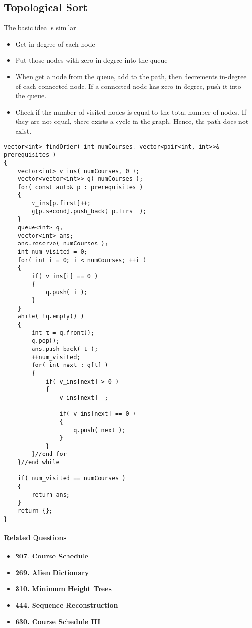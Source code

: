 \subsection{Topological Sort}
The basic idea is similar
\begin{itemize}
    \item Get in-degree of each node
    \item Put those nodes with zero in-degree into the queue
    \item When get a node from the queue, add to the path, then decrements in-degree of each connected node. If a connected node has zero in-degree, push it into the queue.
    \item Check if the number of visited nodes is equal to the total number of nodes. If they are not equal, there exists a cycle in the graph. Hence, the path does not exist.
\end{itemize}
\begin{lstlisting}[style=customc, caption={BFS}]
vector<int> findOrder( int numCourses, vector<pair<int, int>>& prerequisites )
{
    vector<int> v_ins( numCourses, 0 );
    vector<vector<int>> g( numCourses );
    for( const auto& p : prerequisites )
    {
        v_ins[p.first]++;
        g[p.second].push_back( p.first );
    }
    queue<int> q;
    vector<int> ans;
    ans.reserve( numCourses );
    int num_visited = 0;
    for( int i = 0; i < numCourses; ++i )
    {
        if( v_ins[i] == 0 )
        {
            q.push( i );
        }
    }
    while( !q.empty() )
    {
        int t = q.front();
        q.pop();
        ans.push_back( t );
        ++num_visited;
        for( int next : g[t] )
        {
            if( v_ins[next] > 0 )
            {
                v_ins[next]--;

                if( v_ins[next] == 0 )
                {
                    q.push( next );
                }
            }
        }//end for
    }//end while

    if( num_visited == numCourses )
    {
        return ans;
    }
    return {};
}
\end{lstlisting}

\paragraph{Related Questions}
\begin{itemize}
\item \textbf{207. Course Schedule}
\item \textbf{269. Alien Dictionary}
\item \textbf{310. Minimum Height Trees}
\item \textbf{444. Sequence Reconstruction}
\item \textbf{630. Course Schedule III}
\end{itemize}
